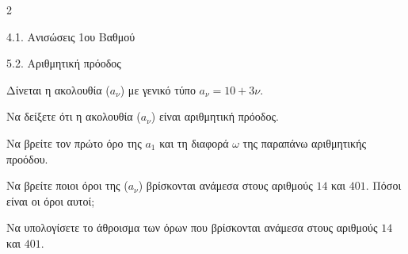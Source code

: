 \begin{ylh}{2}
    \item 4.1. Ανισώσεις 1ου Βαθμού
    \item 5.2. Αριθμητική πρόοδος
\end{ylh}
Δίνεται η ακολουθία ($a_\nu$) με γενικό τύπο $a_\nu = 10 + 3\nu$.
\begin{alist}
\item
\begin{rlist}
\item Να δείξετε ότι η ακολουθία ($a_\nu$) είναι αριθμητική πρόοδος.

\item Nα βρείτε τον πρώτο όρο της $a_1$ και τη διαφορά $\omega$ της παραπάνω αριθμητικής προόδου.
\end{rlist}
\item Να βρείτε ποιοι όροι της ($a_\nu$) βρίσκονται ανάμεσα στους αριθμούς $14$ και $401$. Πόσοι είναι οι όροι αυτοί;
\item Να υπολογίσετε το άθροισμα των όρων που βρίσκονται ανάμεσα στους αριθμούς $14$ και $401$.
\end{alist}


